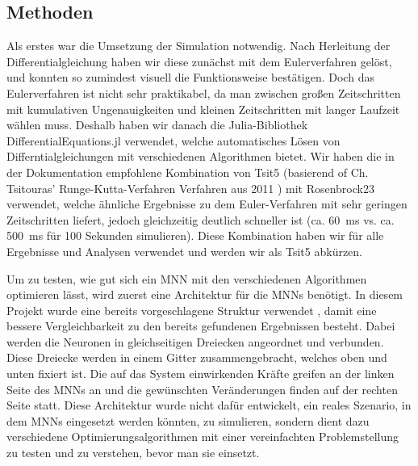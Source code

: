 \subsection{Methoden}

Als erstes war die Umsetzung der Simulation notwendig. Nach Herleitung der Differentialgleichung  haben wir diese zunächst mit dem Eulerverfahren %
gelöst, und konnten so zumindest visuell die Funktionsweise bestätigen. Doch das Eulerverfahren ist nicht sehr praktikabel, da man zwischen großen Zeitschritten mit kumulativen Ungenauigkeiten und kleinen Zeitschritten mit langer Laufzeit wählen muss. Deshalb haben wir danach die Julia-Bibliothek DifferentialEquations.jl verwendet, welche automatisches Lösen von Differntialgleichungen mit verschiedenen Algorithmen bietet. Wir haben die in der Dokumentation empfohlene Kombination von Tsit5 (basierend of Ch. Tsitouras' Runge-Kutta-Verfahren Verfahren aus 2011 \cite{Tsit5}) mit Rosenbrock23 verwendet, welche ähnliche Ergebnisse zu dem Euler-Verfahren mit sehr geringen Zeitschritten liefert, jedoch gleichzeitig deutlich schneller ist (ca. \SI{60}{\milli\second} vs. ca. \SI{500}{\milli\second} für 100 Sekunden simulieren). %
Diese Kombination haben wir für alle Ergebnisse und Analysen verwendet und werden wir als Tsit5 abkürzen.

Um zu testen, wie gut sich ein MNN mit den verschiedenen Algorithmen optimieren lässt, wird zuerst eine Architektur für die MNNs benötigt.
In diesem Projekt wurde eine bereits vorgeschlagene Struktur verwendet \cite{Lee2022}, damit eine bessere Vergleichbarkeit zu den bereits gefundenen Ergebnissen besteht.
Dabei werden die Neuronen in gleichseitigen Dreiecken angeordnet und verbunden.
Diese Dreiecke werden in einem Gitter zusammengebracht, welches oben und unten fixiert ist.
Die auf das System einwirkenden Kräfte greifen an der linken Seite des MNNs an und die gewünschten Veränderungen finden auf der rechten Seite statt.
Diese Architektur wurde nicht dafür entwickelt, ein reales Szenario, in dem MNNs eingesetzt werden könnten, zu simulieren, sondern dient dazu verschiedene Optimierungsalgorithmen mit einer vereinfachten Problemstellung zu testen und zu verstehen, bevor man sie einsetzt.


